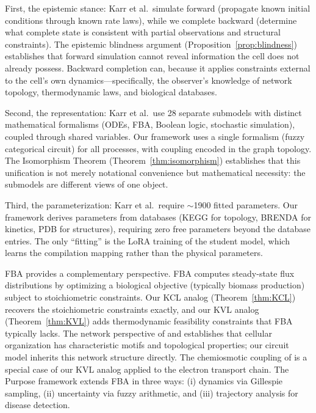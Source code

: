 \documentclass[twocolumn,10pt,a4paper]{article}
\theoremstyle{definition}
\theoremstyle{remark}
\begin{document}
First, the epistemic stance: Karr et al.\ simulate forward (propagate known initial conditions through known rate laws), while we complete backward (determine what complete state is consistent with partial observations and structural constraints). The epistemic blindness argument (Proposition~\ref{prop:blindness}) establishes that forward simulation cannot reveal information the cell does not already possess. Backward completion can, because it applies constraints external to the cell's own dynamics---specifically, the observer's knowledge of network topology, thermodynamic laws, and biological databases.

Second, the representation: Karr et al.\ use 28 separate submodels with distinct mathematical formalisms (ODEs, FBA, Boolean logic, stochastic simulation), coupled through shared variables. Our framework uses a single formalism (fuzzy categorical circuit) for all processes, with coupling encoded in the graph topology. The Isomorphism Theorem (Theorem~\ref{thm:isomorphism}) establishes that this unification is not merely notational convenience but mathematical necessity: the submodels are different views of one object.

Third, the parameterization: Karr et al.\ require $\sim$1900 fitted parameters. Our framework derives parameters from databases (KEGG for topology, BRENDA for kinetics, PDB for structures), requiring zero free parameters beyond the database entries. The only ``fitting'' is the LoRA training of the student model, which learns the compilation mapping rather than the physical parameters.

FBA \citep{Orth2010,Palsson2006} provides a complementary perspective. FBA computes steady-state flux distributions by optimizing a biological objective (typically biomass production) subject to stoichiometric constraints. Our KCL analog (Theorem~\ref{thm:KCL}) recovers the stoichiometric constraints exactly, and our KVL analog (Theorem~\ref{thm:KVL}) adds thermodynamic feasibility constraints that FBA typically lacks. The network perspective of \citet{BarabasiOltvai2004} and \citet{Alon2007} establishes that cellular organization has characteristic motifs and topological properties; our circuit model inherits this network structure directly. The chemiosmotic coupling of \citet{Mitchell1961} is a special case of our KVL analog applied to the electron transport chain. The Purpose framework extends FBA in three ways: (i) dynamics via Gillespie sampling, (ii) uncertainty via fuzzy arithmetic, and (iii) trajectory analysis for disease detection.
\end{document}
